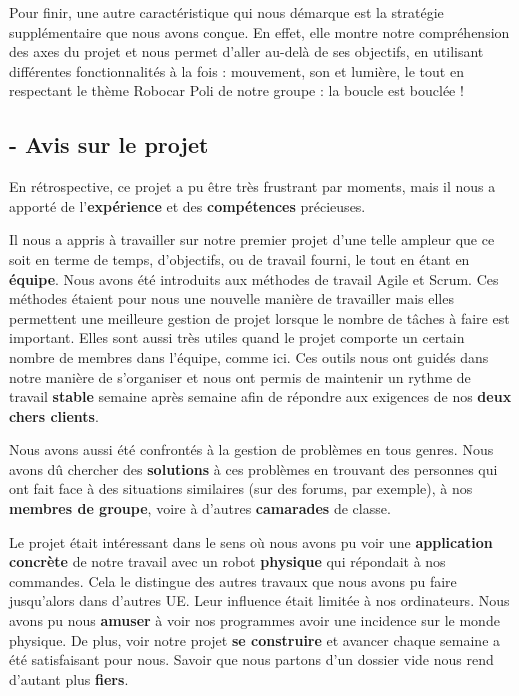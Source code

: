 \documentclass[12pt]{article}
\begin{document}
\clearpage
\hspace{\parindent} Pour finir, une autre caractéristique qui nous démarque est la stratégie supplémentaire que nous avons conçue. En effet, elle montre notre compréhension des axes du projet et nous permet d'aller au-delà de ses objectifs, en utilisant différentes fonctionnalités à la fois : mouvement, son et lumière, le tout en respectant le thème Robocar Poli de notre groupe : la boucle est bouclée ! \\


\subsection*{- Avis sur le projet}

\hspace{\parindent}En rétrospective, ce projet a pu être très frustrant par  moments, mais il nous a apporté de l’\textbf{expérience} et des \textbf{compétences} précieuses. 

\hspace{\parindent}Il nous a appris à travailler sur notre premier projet d’une telle ampleur que ce soit en terme de temps, d'objectifs, ou de travail fourni, le tout en étant en \textbf{équipe}. Nous avons été introduits aux méthodes de travail Agile et Scrum. Ces méthodes étaient pour nous une nouvelle manière de travailler mais elles permettent une meilleure gestion de projet lorsque le nombre de tâches à faire est important. Elles sont aussi très utiles quand le projet comporte un certain nombre de membres dans l’équipe, comme ici. Ces outils nous ont guidés dans notre manière de s’organiser et nous ont permis de maintenir un rythme de travail \textbf{stable} semaine après semaine afin de répondre aux exigences de nos \textbf{deux chers clients}. 

\hspace{\parindent}Nous avons aussi été confrontés à la gestion de problèmes en tous genres. Nous avons dû chercher des \textbf{solutions} à ces problèmes en trouvant des personnes qui ont fait face à des situations similaires (sur des forums, par exemple), à nos \textbf{membres de groupe}, voire à d’autres \textbf{camarades} de classe.

\hspace{\parindent}Le projet était intéressant dans le sens où nous avons pu voir une \textbf{application concrète} de notre travail avec un robot \textbf{physique} qui répondait à nos commandes. Cela le distingue des autres travaux que nous avons pu faire jusqu’alors dans d'autres UE. Leur influence était limitée à nos ordinateurs. Nous avons pu nous \textbf{amuser} à voir nos programmes avoir une incidence sur le monde physique. De plus, voir notre projet \textbf{se construire} et avancer chaque semaine a été satisfaisant pour nous. Savoir que nous partons d'un dossier vide nous rend d'autant plus \textbf{fiers}.
\end{document}
